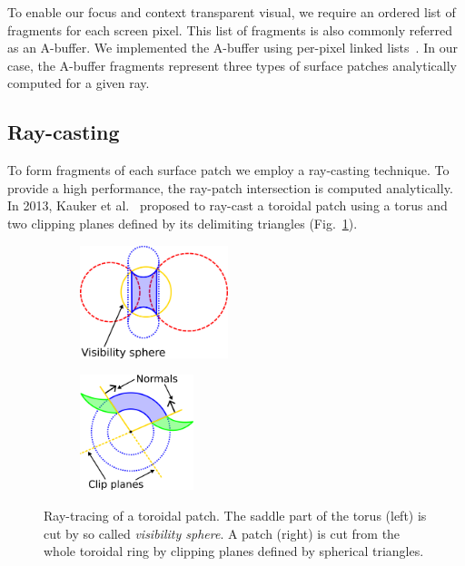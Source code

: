 \label{sec:vis}

To enable our focus and context transparent visual, we require an ordered list of fragments for each screen pixel. This list of fragments is also commonly referred as an A-buffer. We implemented the A-buffer using per-pixel linked lists~\cite{yang2010real}. In our case, the A-buffer fragments represent three types of surface patches analytically computed for a given ray.

\subsection{Ray-casting}
\label{sec:spherical-patches}
To form fragments of each surface patch we employ a ray-casting technique. To provide a high performance, the ray-patch intersection is computed analytically.
In 2013, Kauker et al.~\cite{kauker2013rendering} proposed to ray-cast a toroidal patch using a torus and two clipping planes defined by its delimiting triangles (Fig.~\ref{fig:torus-vs}).
\begin{figure}[htp]
  \centering
  \begin{subfigure}[t]{0.55\columnwidth}
    \centering
    \includegraphics[width=1.7in]{image/torus-vs.png}
  \end{subfigure}%
  \quad
  \begin{subfigure}[t]{0.4\columnwidth}
    \centering
    \includegraphics[width=1.3in]{image/torus-planes.png}
  \end{subfigure}
\caption{Ray-tracing of a toroidal patch. The saddle part of the torus (left) is cut by so called \textit{visibility sphere}.
A patch (right) is cut from the whole toroidal ring by clipping planes defined by spherical triangles.}
\label{fig:torus-vs}
\end{figure}

